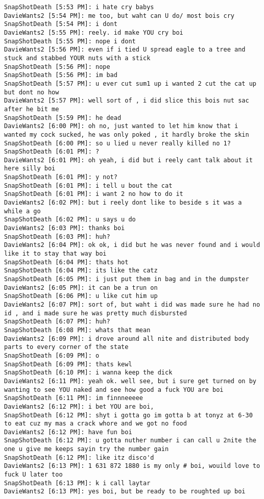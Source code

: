 \begin{verbatim}
SnapShotDeath [5:53 PM]: i hate cry babys 
DavieWants2 [5:54 PM]: me too, but waht can U do/ most bois cry 
SnapShotDeath [5:54 PM]: i dont 
DavieWants2 [5:55 PM]: reely. id make YOU cry boi 
SnapShotDeath [5:55 PM]: nope i dont 
DavieWants2 [5:56 PM]: even if i tied U spread eagle to a tree and stuck and stabbed YOUR nuts with a stick 
SnapShotDeath [5:56 PM]: nope 
SnapShotDeath [5:56 PM]: im bad 
SnapShotDeath [5:57 PM]: u ever cut sum1 up i wanted 2 cut the cat up but dont no how 
DavieWants2 [5:57 PM]: well sort of , i did slice this bois nut sac after he bit me 
SnapShotDeath [5:59 PM]: he dead 
DavieWants2 [6:00 PM]: oh no, just wanted to let him know that i wanted my cock sucked, he was only poked , it hardly broke the skin 
SnapShotDeath [6:00 PM]: so u lied u never really killed no 1? 
SnapShotDeath [6:01 PM]: ? 
DavieWants2 [6:01 PM]: oh yeah, i did but i reely cant talk about it here silly boi 
SnapShotDeath [6:01 PM]: y not? 
SnapShotDeath [6:01 PM]: i tell u bout the cat 
SnapShotDeath [6:01 PM]: i want 2 no how to do it 
DavieWants2 [6:02 PM]: but i reely dont like to beside s it was a while a go 
SnapShotDeath [6:02 PM]: u says u do 
DavieWants2 [6:03 PM]: thanks boi 
SnapShotDeath [6:03 PM]: huh? 
DavieWants2 [6:04 PM]: ok ok, i did but he was never found and i would like it to stay that way boi 
SnapShotDeath [6:04 PM]: thats hot 
SnapShotDeath [6:04 PM]: its like the catz 
SnapShotDeath [6:05 PM]: i just put them in bag and in the dumpster 
DavieWants2 [6:05 PM]: it can be a trun on 
SnapShotDeath [6:06 PM]: u like cut him up 
DavieWants2 [6:07 PM]: sort of, but waht i did was made sure he had no id , and i made sure he was pretty much disbursted 
SnapShotDeath [6:07 PM]: huh? 
SnapShotDeath [6:08 PM]: whats that mean 
DavieWants2 [6:09 PM]: i drove around all nite and distributed body parts to every corner of the state 
SnapShotDeath [6:09 PM]: o 
SnapShotDeath [6:09 PM]: thats kewl 
SnapShotDeath [6:10 PM]: i wanna keep the dick 
DavieWants2 [6:11 PM]: yeah ok. well see, but i sure get turned on by wanting to see YOU naked and see how good a fuck YOU are boi 
SnapShotDeath [6:11 PM]: im finnneeeee 
DavieWants2 [6:12 PM]: i bet YOU are boi, 
SnapShotDeath [6:12 PM]: shyt i gotta go im gotta b at tonyz at 6-30 to eat cuz my mas a crack whore and we got no food 
DavieWants2 [6:12 PM]: have fun boi 
SnapShotDeath [6:12 PM]: u gotta nuther number i can call u 2nite the one u give me keeps sayin try the number gain 
SnapShotDeath [6:12 PM]: like itz disco'd 
DavieWants2 [6:13 PM]: 1 631 872 1880 is my only # boi, wouild love to fuck U later too 
SnapShotDeath [6:13 PM]: k i call laytar 
DavieWants2 [6:13 PM]: yes boi, but be ready to be roughted up boi
\end{verbatim}